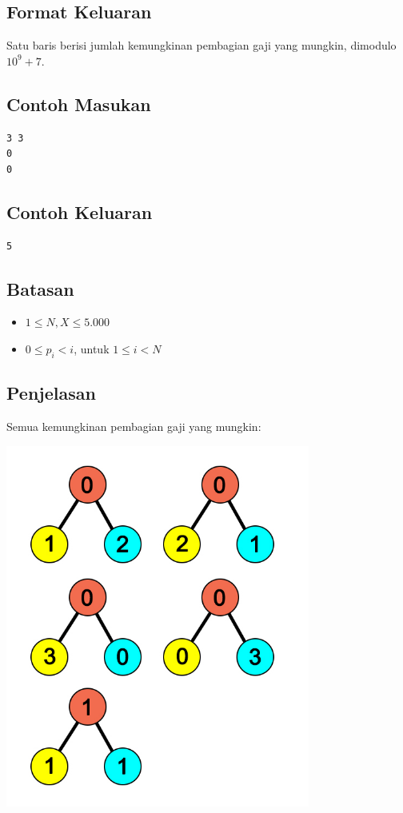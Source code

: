 \documentclass{article}
\begin{document}
\subsection*{Format Keluaran}

\par\noindent Satu baris berisi jumlah kemungkinan pembagian gaji yang mungkin, dimodulo $10^9+7$.

\subsection*{Contoh Masukan}

\begin{lstlisting}
3 3
0
0
\end{lstlisting}

\subsection*{Contoh Keluaran}

\begin{lstlisting}
5
\end{lstlisting}

\subsection*{Batasan}

\begin{itemize}
  \item $1 \leq N, X \leq 5.000$
  \item $0 \leq p_{i} < i$, untuk $1 \leq i < N$
\end{itemize}

\subsection*{Penjelasan}

\par\noindent Semua kemungkinan pembagian gaji yang mungkin:

\includegraphics[width=10cm]{sample-1}
\end{document}
